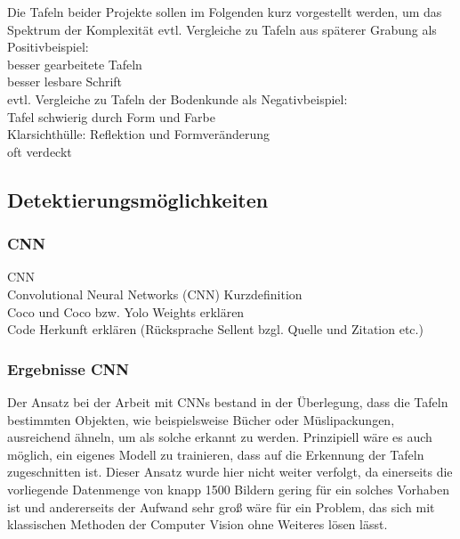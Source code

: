 Die Tafeln beider Projekte sollen im Folgenden kurz vorgestellt werden, um das Spektrum der Komplexität 
evtl. Vergleiche zu Tafeln aus späterer Grabung als Positivbeispiel:\\
besser gearbeitete Tafeln\\
besser lesbare Schrift\\
evtl. Vergleiche zu Tafeln der Bodenkunde als Negativbeispiel:\\
Tafel schwierig durch Form und Farbe\\
Klarsichthülle: Reflektion und Formveränderung\\
oft verdeckt\\

\subsection{Detektierungsmöglichkeiten}

\subsubsection{CNN}

CNN\\

Convolutional Neural Networks (CNN) Kurzdefinition\\

Coco und Coco bzw. Yolo Weights erklären\\

Code Herkunft erklären (Rücksprache Sellent bzgl. Quelle und Zitation etc.)\\

\subsubsection{Ergebnisse CNN}

Der Ansatz bei der Arbeit mit CNNs bestand in der Überlegung, dass die Tafeln bestimmten Objekten, wie beispielsweise Bücher oder Müslipackungen, ausreichend ähneln, um als solche erkannt zu werden. Prinzipiell wäre es auch möglich, ein eigenes Modell zu trainieren, dass auf die Erkennung der Tafeln zugeschnitten ist. Dieser Ansatz wurde hier nicht weiter verfolgt, da einerseits die vorliegende Datenmenge von knapp 1500 Bildern gering für ein solches Vorhaben ist und andererseits der Aufwand sehr groß wäre für ein Problem, das sich mit klassischen Methoden der Computer Vision ohne Weiteres lösen lässt.\\


